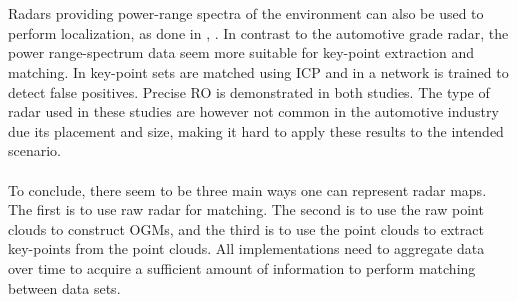 \\\\
Radars providing power-range spectra of the environment can also be used to perform localization, as done in \cite{cen_precise_2018}, \cite{aldera_what_2019}. In contrast to the automotive grade radar, the power range-spectrum data seem more suitable for key-point extraction and matching. In \cite{cen_precise_2018} key-point sets are matched using ICP and in \cite{aldera_what_2019} a network is trained to detect false positives.  Precise \ac{RO} is demonstrated in both studies. The type of radar used in these studies are however not common in the automotive industry due its placement and size, making it hard to apply these results to the intended scenario. 
\\\\
To conclude, there seem to be three main ways one can represent radar maps. The first is to use raw radar for matching. The second is to use the raw point clouds to construct OGMs, and the third is to use the point clouds to extract key-points from the point clouds. All implementations need to aggregate data over time to acquire a sufficient amount of information to perform matching between data sets.
